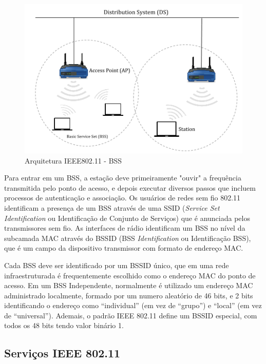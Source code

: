 \documentclass[
12pt,				%
openright,			%
oneside,			%
a4paper,			%
brazil,				%
]{abntex2}
\begin{document}
	\begin{figure} [H]
		\centering
		\includegraphics[scale=.6]{figuras/cap2/11ArquiteturaIEEE80211BSS}
		\caption{\label{fig_11}Arquitetura IEEE802.11 - BSS}
	\end{figure}
	
	\par Para entrar em um BSS, a estação deve primeiramente "ouvir" a frequência transmitida pelo ponto de acesso, e depois executar diversos passos que incluem processos de autenticação e associação. Os usuários de redes sem fio 802.11 identificam a presença de um BSS através de uma SSID (\textit{Service Set Identification} ou Identificação de Conjunto de Serviços) que é anunciada pelos transmissores sem fio. As interfaces de rádio identificam um BSS no nível da subcamada MAC através do BSSID (BSS \textit{Identification} ou Identificação BSS), que é um campo da dispositivo transmissor com formato de endereço MAC.
	
	\par Cada BSS deve ser identificado por um BSSID único, que em uma rede infraestruturada é frequentemente escolhido como o endereço MAC do ponto de acesso. Em um BSS Independente, normalmente é utilizado um endereço MAC administrado localmente, formado por um numero aleatório de 46 bits, e 2 bits identificando o endereço como “individual” (em vez de “grupo”) e “local” (em vez de “universal”). Ademais, o padrão IEEE 802.11 define um BSSID especial, com todos os 48 bits tendo valor binário 1.
	
	\subsection{Serviços IEEE 802.11}
	
\end{document}
